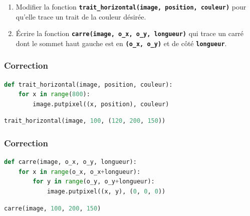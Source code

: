 \documentclass[svgnames,11pt]{beamer}
\begin{document}
\begin{frame}
    \frametitle{}

    \begin{activite}
    \begin{enumerate}
        \item Modifier la fonction \textbf{\texttt{trait\_horizontal(image, position, couleur)}} pour qu'elle trace un trait de la couleur désirée.
        \item Écrire la fonction \textbf{\texttt{carre(image, o\_x, o\_y, longueur)}} qui trace un carré dont le sommet haut gauche est en \texttt{\textbf{(o\_x, o\_y)}} et de côté \textbf{\texttt{longueur}}.
    \end{enumerate}
    \end{activite}

\end{frame}
\begin{frame}[fragile]
    \frametitle{Correction}
\begin{center}
\begin{lstlisting}[language=Python , basicstyle=\ttfamily\small, xleftmargin=1em, xrightmargin=1.5em]
def trait_horizontal(image, position, couleur):
    for x in range(800):
        image.putpixel((x, position), couleur)
\end{lstlisting}
\label{CODE}
\end{center}

\begin{center}
\begin{lstlisting}[language=Python , basicstyle=\ttfamily\small, xleftmargin=2em, xrightmargin=1.5em]
trait_horizontal(image, 100, (120, 200, 150))
\end{lstlisting}
\label{CODE}
\end{center}

\end{frame}
\begin{frame}[fragile]
    \frametitle{Correction}
\begin{center}
\begin{lstlisting}[language=Python , basicstyle=\ttfamily\small, xleftmargin=2em, xrightmargin=2em]
def carre(image, o_x, o_y, longueur):
    for x in range(o_x, o_x+longueur):
        for y in range(o_y, o_y+longueur):
            image.putpixel((x, y), (0, 0, 0))
\end{lstlisting}
\label{CODE}
\end{center}

\begin{center}
\begin{lstlisting}[language=Python , basicstyle=\ttfamily\small, xleftmargin=2em, xrightmargin=1.5em]
carre(image, 100, 200, 150)
\end{lstlisting}
\label{CODE}
\end{center}

\end{frame}
\end{document}
